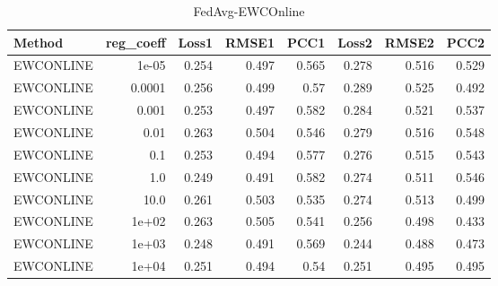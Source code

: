 \begin{table}
\caption{FedAvg-EWCOnline}
\begin{tabular}{lrrrrrrr}
\toprule
Method & reg_coeff & Loss1 & RMSE1 & PCC1 & Loss2 & RMSE2 & PCC2 \\
\midrule
EWCONLINE & 1e-05 & 0.254 & 0.497 & 0.565 & 0.278 & 0.516 & 0.529 \\
EWCONLINE & 0.0001 & 0.256 & 0.499 & 0.57 & 0.289 & 0.525 & 0.492 \\
EWCONLINE & 0.001 & 0.253 & 0.497 & 0.582 & 0.284 & 0.521 & 0.537 \\
EWCONLINE & 0.01 & 0.263 & 0.504 & 0.546 & 0.279 & 0.516 & 0.548 \\
EWCONLINE & 0.1 & 0.253 & 0.494 & 0.577 & 0.276 & 0.515 & 0.543 \\
EWCONLINE & 1.0 & 0.249 & 0.491 & 0.582 & 0.274 & 0.511 & 0.546 \\
EWCONLINE & 10.0 & 0.261 & 0.503 & 0.535 & 0.274 & 0.513 & 0.499 \\
EWCONLINE & 1e+02 & 0.263 & 0.505 & 0.541 & 0.256 & 0.498 & 0.433 \\
EWCONLINE & 1e+03 & 0.248 & 0.491 & 0.569 & 0.244 & 0.488 & 0.473 \\
EWCONLINE & 1e+04 & 0.251 & 0.494 & 0.54 & 0.251 & 0.495 & 0.495 \\
\bottomrule
\end{tabular}
\end{table}
